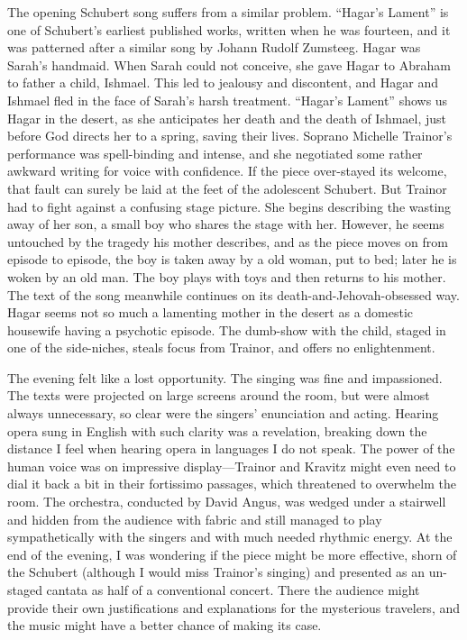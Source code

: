 The opening Schubert song suffers from a similar problem. “Hagar’s Lament” is one of Schubert’s earliest published works, written when he was fourteen, and it was patterned after a similar song by Johann Rudolf Zumsteeg. Hagar was Sarah’s handmaid. When Sarah could not conceive, she gave Hagar to Abraham to father a child, Ishmael. This led to jealousy and discontent, and Hagar and Ishmael fled in the face of Sarah’s harsh treatment. “Hagar’s Lament” shows us Hagar in the desert, as she anticipates her death and the death of Ishmael, just before God directs her to a spring, saving their lives. Soprano Michelle Trainor’s performance was spell-binding and intense, and she negotiated some rather awkward writing for voice with confidence. If the piece over-stayed its welcome, that fault can surely be laid at the feet of the adolescent Schubert. But Trainor had to fight against a confusing stage picture. She begins describing the wasting away of her son, a small boy who shares the stage with her. However, he seems untouched by the tragedy his mother describes, and as the piece moves on from episode to episode, the boy is taken away by a old woman, put to bed; later he is woken by an old man. The boy plays with toys and then returns to his mother. The text of the song meanwhile continues on its death-and-Jehovah-obsessed way. Hagar seems not so much a lamenting mother in the desert as a domestic housewife having a psychotic episode. The dumb-show with the child, staged in one of the side-niches, steals focus from Trainor, and offers no enlightenment.

The evening felt like a lost opportunity. The singing was fine and impassioned. The texts were projected on large screens around the room, but were almost always unnecessary, so clear were the singers’ enunciation and acting. Hearing opera sung in English with such clarity was a revelation, breaking down the distance I feel when hearing opera in languages I do not speak. The power of the human voice was on impressive display—Trainor and Kravitz might even need to dial it back a bit in their fortissimo passages, which threatened to overwhelm the room. The orchestra, conducted by David Angus, was wedged under a stairwell and hidden from the audience with fabric and still managed to play sympathetically with the singers and with much needed rhythmic energy. At the end of the evening, I was wondering if the piece might be more effective, shorn of the Schubert (although I would miss Trainor’s singing) and presented as an un-staged cantata as half of a conventional concert. There the audience might provide their own justifications and explanations for the mysterious travelers, and the music might have a better chance of making its case.